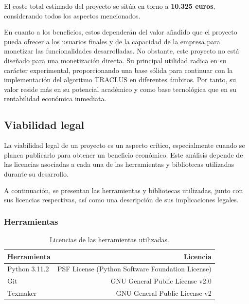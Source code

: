 El coste total estimado del proyecto se sitúa en torno a \textbf{10.325 euros}, considerando todos los aspectos mencionados.

En cuanto a los beneficios, estos dependerán del valor añadido que el proyecto pueda ofrecer a los usuarios finales y de la capacidad de la empresa para monetizar las funcionalidades desarrolladas. No obstante, este proyecto no está diseñado para una monetización directa. Su principal utilidad radica en su carácter experimental, proporcionando una base sólida para continuar con la implementación del algoritmo TRACLUS en diferentes ámbitos. Por tanto, su valor reside más en su potencial académico y como base tecnológica que en su rentabilidad económica inmediata.

\subsection{Viabilidad legal}

La viabilidad legal de un proyecto es un aspecto crítico, especialmente cuando se planea publicarlo para obtener un beneficio económico. Este análisis depende de las licencias asociadas a cada una de las herramientas y bibliotecas utilizadas durante su desarrollo.

A continuación, se presentan las herramientas y bibliotecas utilizadas, junto con sus licencias respectivas, así como una descripción de sus implicaciones legales.

\subsubsection{Herramientas}

\begin{table}[H]
\centering
\begin{tabular}{lr}
\toprule
Herramienta & Licencia \\ 
\midrule
Python 3.11.2 & PSF License (Python Software Foundation License) \\ 
Git & GNU General Public License v2.0 \\ 
Texmaker & GNU General Public License v2 \\ 
\bottomrule
\end{tabular}
\caption{Licencias de las herramientas utilizadas.}
\end{table}


